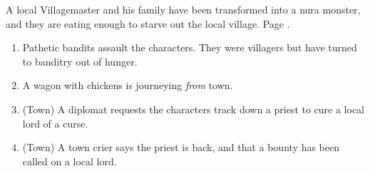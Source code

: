 A local Villagemaster and his family have been transformed into a nura monster, and they are eating enough to starve out the local village.
Page \pageref{desperatemeasures}.

\begin{enumerate}

	\item{ Pathetic bandits assault the characters.  They were villagers but have turned to banditry out of hunger.}
	\item{A wagon with chickens is journeying \emph{from} town.}
	\item{ (Town) A diplomat requests the characters track down a priest to cure a local lord of a curse.}
	\item{ (Town) A town crier says the priest is back, and that a bounty has been called on a local lord.}
\end{enumerate}


%
%
%
%
%

\setcounter{encnum}{1}

